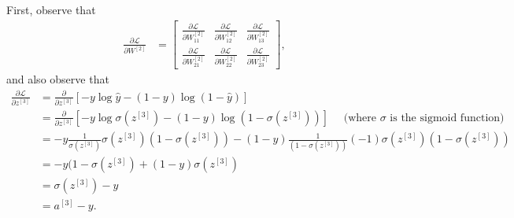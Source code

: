 \documentclass{article}
\numberwithin{equation}{section}
\begin{document}
First, observe that
\begin{align*}
\frac{\partial \mathcal{L}}{\partial W^{[2]}} &= \begin{bmatrix} \frac{\partial \mathcal{L}}{\partial W^{[2]}_{11}} & \frac{\partial \mathcal{L}}{\partial W^{[2]}_{12}} & \frac{\partial \mathcal{L}}{\partial W^{[2]}_{13}} \\
\frac{\partial \mathcal{L}}{\partial W^{[2]}_{21}} & \frac{\partial \mathcal{L}}{\partial W^{[2]}_{22}} & \frac{\partial \mathcal{L}}{\partial W^{[2]}_{23}} \end{bmatrix},
\end{align*}
and also observe that
\begin{align*}
\frac{\partial \mathcal{L}}{\partial z^{[3]}} &= \frac{\partial}{\partial z^{[3]}}\left[-y\log \hat{y} - (1-y)\log (1-\hat{y})\right] \\
&= \frac{\partial}{\partial z^{[3]}}\left[-y\log \sigma(z^{[3]}) - (1-y)\log (1-\sigma(z^{[3]}))\right] \quad \text{ (where $\sigma$ is the sigmoid function)}\\
&= -y\frac{1}{\sigma(z^{[3]})}\sigma(z^{[3]})(1-\sigma(z^{[3]})) - (1-y)\frac{1}{(1-\sigma(z^{[3]}))}(-1)\sigma(z^{[3]})(1-\sigma(z^{[3]})) \\
&= -y(1-\sigma(z^{[3]}) + (1-y)\sigma(z^{[3]}) \\
&= \sigma(z^{[3]}) - y \\
&= a^{[3]} - y.
\end{align*}
\end{document}
